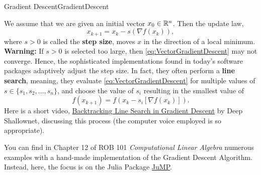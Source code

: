 \vspace*{0.2cm}
\begin{methodColor}{Gradient Descent}{GradientDescent}

We assume that we are given an initial vector $x_0 \in \mathbb R^n$. Then the update law,
\begin{equation}
    \label{eq:VectorGradientDescent}
    x_{k+1}=x_k - s \left( \nabla f(x_k) \right),
    \end{equation}
    where $s>0$ is called the \textbf{step size}, moves $x$ in the direction of a local minimum. \\
    
    \textbf{Warning:} If $s>0$ is selected too large, then \eqref{eq:VectorGradientDescent} may not converge. Hence, the sophisticated implementations found in today's software packages adaptively adjust the step size. In fact, they often perform a \textbf{line search}, meaning, they evaluate \eqref{eq:VectorGradientDescent} for multiple values of $s \in \{s_1, s_2, \ldots, s_n\}$, and choose the value of $s_i$ resulting in the smallest value of 
    $$f(x_{k+1})= f\left(x_k - s_i \left[ \nabla f(x_k) \right] \right).$$ Here is a short video, \href{https://www.youtube.com/watch?v=4qDt4QUl4zE}{Backtracking Line Search in Gradient Descent} by Deep Shallownet, discussing this process (the computer voice employed is so appropriate).
\end{methodColor}

\bigskip

You can find in Chapter 12 of ROB 101 \textit{Computational Linear Algebra} numerous examples with a hand-made implementation of the Gradient Descent Algorithm. Instead, here, the focus is on the Julia Package \href{https://jump.dev/JuMP.jl/stable/}{JuMP}. 

\begin{center}
\setlength{\fboxrule}{2pt}  %
\end{center}


